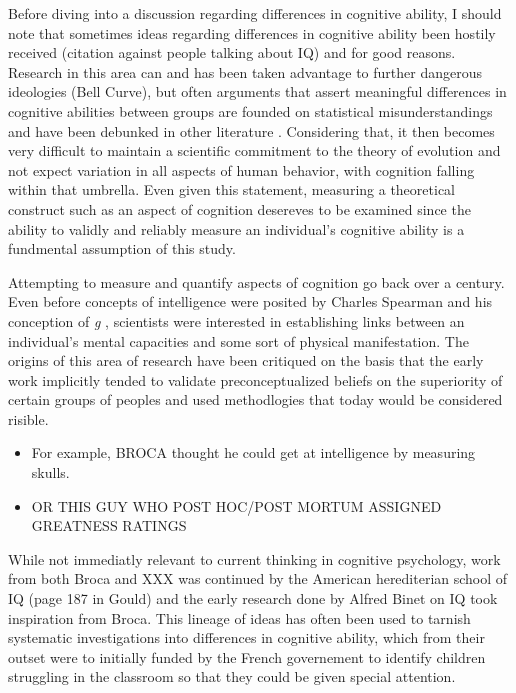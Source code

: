 \documentclass[]{book}
\providecommand{\tightlist}{%
  \setlength{\itemsep}{0pt}\setlength{\parskip}{0pt}}
\theoremstyle{definition}
\theoremstyle{definition}
\theoremstyle{definition}
\theoremstyle{remark}
\begin{document}
Before diving into a discussion regarding differences in cognitive
ability, I should note that sometimes ideas regarding differences in
cognitive ability been hostily received (citation against people talking
about IQ) and for good reasons. Research in this area can and has been
taken advantage to further dangerous ideologies (Bell Curve), but often
arguments that assert meaningful differences in cognitive abilities
between groups are founded on statistical misunderstandings and have
been debunked in other literature \citep{gouldMismeasureMan1996}.
Considering that, it then becomes very difficult to maintain a
scientific commitment to the theory of evolution
\citep{darwinOriginSpecies1859} and not expect variation in all aspects
of human behavior, with cognition falling within that umbrella. Even
given this statement, measuring a theoretical construct such as an
aspect of cognition desereves to be examined since the ability to
validly and reliably measure an individual's cognitive ability is a
fundmental assumption of this study.

Attempting to measure and quantify aspects of cognition go back over a
century. Even before concepts of intelligence were posited by Charles
Spearman and his conception of \emph{g}
\citep{spearmanGeneralIntelligenceObjectively1904}, scientists were
interested in establishing links between an individual's mental
capacities and some sort of physical manifestation. The origins of this
area of research have been critiqued on the basis that the early work
implicitly tended to validate preconceptualized beliefs on the
superiority of certain groups of peoples and used methodlogies that
today would be considered risible.

\begin{itemize}
\tightlist
\item
  For example, BROCA thought he could get at intelligence by measuring
  skulls.
\item
  OR THIS GUY WHO POST HOC/POST MORTUM ASSIGNED GREATNESS RATINGS
\end{itemize}

While not immediatly relevant to current thinking in cognitive
psychology, work from both Broca and XXX was continued by the American
herediterian school of IQ (page 187 in Gould) and the early research
done by Alfred Binet on IQ took inspiration from Broca. This lineage of
ideas has often been used to tarnish systematic investigations into
differences in cognitive ability, which from their outset were to
initially funded by the French governement to identify children
struggling in the classroom so that they could be given special
attention.
\end{document}
